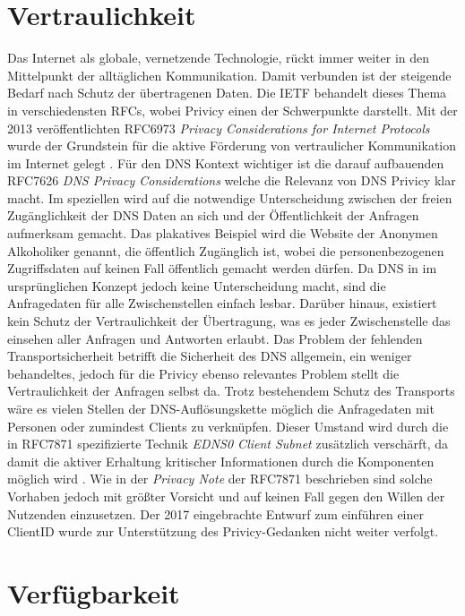 \section{Vertraulichkeit}
\label{sec:Thread-Priv}

Das Internet als globale, vernetzende Technologie, rückt immer weiter in den Mittelpunkt der alltäglichen Kommunikation. Damit verbunden ist der steigende Bedarf nach Schutz der übertragenen Daten. Die IETF behandelt dieses Thema in verschiedensten RFCs, wobei Privicy einen der Schwerpunkte darstellt. Mit der 2013 veröffentlichten RFC6973 \textit{Privacy Considerations for Internet Protocols}\cite{rfc6973} wurde der Grundstein für die aktive Förderung von vertraulicher Kommunikation im Internet gelegt . 
Für den DNS Kontext wichtiger ist die darauf aufbauenden RFC7626 \textit{DNS Privacy Considerations}\cite{rfc7626} welche die Relevanz von DNS Privicy klar macht. Im speziellen wird auf die notwendige Unterscheidung zwischen der freien Zugänglichkeit der DNS Daten an sich und der Öffentlichkeit der Anfragen aufmerksam gemacht. Das plakatives Beispiel wird die Website der Anonymen Alkoholiker genannt, die öffentlich Zugänglich ist, wobei die personenbezogenen Zugriffsdaten auf keinen Fall öffentlich gemacht werden dürfen. Da DNS in im ursprünglichen Konzept jedoch keine Unterscheidung macht, sind die Anfragedaten für alle Zwischenstellen einfach lesbar. Darüber hinaus, existiert kein Schutz der Vertraulichkeit der Übertragung, was es jeder Zwischenstelle das einsehen aller Anfragen und Antworten erlaubt.
Das Problem der fehlenden Transportsicherheit betrifft die Sicherheit des DNS allgemein, ein weniger behandeltes, jedoch für die Privicy ebenso relevantes Problem stellt die Vertraulichkeit der Anfragen selbst da. Trotz bestehendem Schutz des Transports wäre es vielen Stellen der DNS-Auflösungskette möglich die Anfragedaten mit Personen oder zumindest Clients zu verknüpfen. Dieser Umstand wird durch die in RFC7871 spezifizierte Technik \textit{EDNS0 Client Subnet} zusätzlich verschärft, da damit die aktiver Erhaltung kritischer Informationen durch die Komponenten möglich wird \cite{Contavalli2016}. Wie in der \textit{Privacy Note} der RFC7871 beschrieben sind solche Vorhaben jedoch mit größter Vorsicht und auf keinen Fall gegen den Willen der Nutzenden einzusetzen. Der 2017 eingebrachte Entwurf zum einführen einer ClientID\cite{Licht2017} wurde zur Unterstützung des Privicy-Gedanken nicht weiter verfolgt.

\section{Verfügbarkeit}
\label{sec:Thread-DosAmp}

